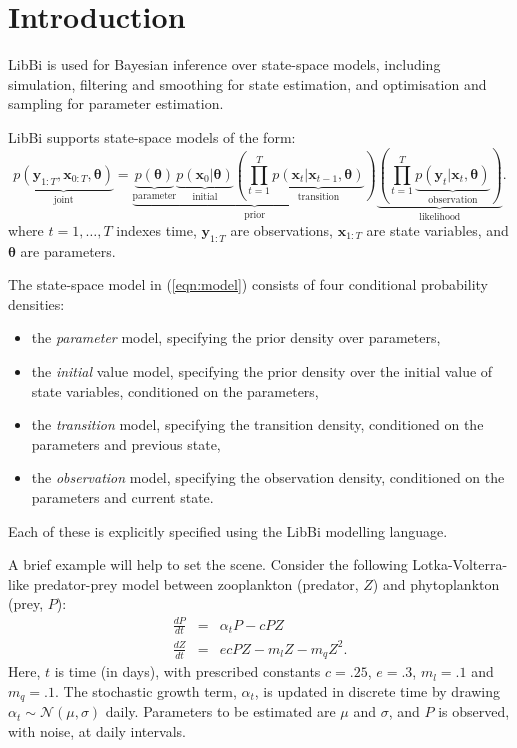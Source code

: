 \section{Introduction\label{Introduction}}

LibBi is used for Bayesian inference over state-space models, including
simulation, filtering and smoothing for state estimation, and optimisation and
sampling for parameter estimation.

LibBi supports state-space models of the form:
\begin{equation}\label{eqn:model}
\underbrace{p(\mathbf{y}_{1:T},\mathbf{x}_{0:T},\boldsymbol{\theta})}_{\text{joint}} =
\underbrace{\underbrace{p(\boldsymbol{\theta})}_{\text{parameter}}
\underbrace{p(\mathbf{x}_0|\boldsymbol{\theta})}_{\text{initial}}
\left(\prod_{t=1}^T
\underbrace{p(\mathbf{x}_t|\mathbf{x}_{t-1},\boldsymbol{\theta})}_{\text{transition}}\right)}_{\text{prior}}
\underbrace{\left(\prod_{t=1}^T \underbrace{p(\mathbf{y}_t|\mathbf{x}_t,\boldsymbol{\theta})}_{\text{observation}}\right)}_{\text{likelihood}}.
\end{equation}
where $t = 1,\ldots,T$ indexes time, $\mathbf{y}_{1:T}$ are observations,
$\mathbf{x}_{1:T}$ are state variables, and $\boldsymbol{\theta}$ are
parameters.

The state-space model in (\ref{eqn:model}) consists of four conditional
probability densities:
\begin{itemize}
\item the \emph{parameter} model, specifying the prior density over parameters,
\item the \emph{initial} value model, specifying the prior density over the
  initial value of state variables, conditioned on the parameters,
\item the \emph{transition} model, specifying the transition density,
  conditioned on the parameters and previous state,
\item the \emph{observation} model, specifying the observation density,
  conditioned on the parameters and current state.
\end{itemize}
Each of these is explicitly specified using the LibBi modelling
language.

A brief example will help to set the scene. Consider the following
Lotka-Volterra-like predator-prey
model between zooplankton (predator, $Z$) and phytoplankton (prey, $P$):
\begin{eqnarray*}
\frac{dP}{dt} &=& \alpha_t P - cPZ\\
\frac{dZ}{dt} &=& ecPZ - m_lZ - m_q Z^2.
\end{eqnarray*}
Here, $t$ is time (in days), with prescribed constants $c = .25$, $e = .3$,
$m_l = .1$ and $m_q = .1$. The stochastic growth term, $\alpha_t$, is updated
in discrete time by drawing $\alpha_t \sim \mathcal{N}(\mu,\sigma)$
daily. Parameters to be estimated are $\mu$ and $\sigma$, and $P$ is observed,
with noise, at daily intervals.


